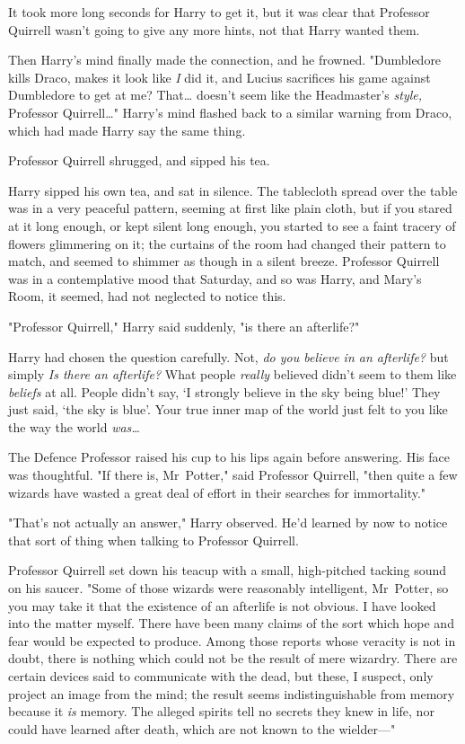 It took more long seconds for Harry to get it, but it was clear that Professor
Quirrell wasn't going to give any more hints, not that Harry wanted them.

Then Harry's mind finally made the connection, and he frowned. "Dumbledore
kills Draco, makes it look like \emph{I} did it, and Lucius sacrifices his game
against Dumbledore to get at me? That{\ldots} doesn't seem like the
Headmaster's \emph{style,} Professor Quirrell{\ldots}" Harry's mind flashed
back to a similar warning from Draco, which had made Harry say the same thing.

Professor Quirrell shrugged, and sipped his tea.

Harry sipped his own tea, and sat in silence. The tablecloth spread over the
table was in a very peaceful pattern, seeming at first like plain cloth, but if
you stared at it long enough, or kept silent long enough, you started to see a
faint tracery of flowers glimmering on it; the curtains of the room had changed
their pattern to match, and seemed to shimmer as though in a silent breeze.
Professor Quirrell was in a contemplative mood that Saturday, and so was Harry,
and Mary's Room, it seemed, had not neglected to notice this.

"Professor Quirrell," Harry said suddenly, "is there an afterlife?"

Harry had chosen the question carefully. Not, \emph{do you believe in an
afterlife?} but simply \emph{Is there an afterlife?} What people \emph{really}
believed didn't seem to them like \emph{beliefs} at all. People didn't say, `I
strongly believe in the sky being blue!' They just said, `the sky is blue'.
Your true inner map of the world just felt to you like the way the world
\emph{was{\ldots}}

The Defence Professor raised his cup to his lips again before answering. His
face was thoughtful. "If there is, Mr~Potter," said Professor Quirrell, "then
quite a few wizards have wasted a great deal of effort in their searches for
immortality."

"That's not actually an answer," Harry observed. He'd learned by now to notice
that sort of thing when talking to Professor Quirrell.

Professor Quirrell set down his teacup with a small, high-pitched tacking sound
on his saucer. "Some of those wizards were reasonably intelligent, Mr~Potter,
so you may take it that the existence of an afterlife is not obvious. I have
looked into the matter myself. There have been many claims of the sort which
hope and fear would be expected to produce. Among those reports whose veracity
is not in doubt, there is nothing which could not be the result of mere
wizardry. There are certain devices said to communicate with the dead, but
these, I suspect, only project an image from the mind; the result seems
indistinguishable from memory because it \emph{is} memory. The alleged spirits
tell no secrets they knew in life, nor could have learned after death, which
are not known to the wielder---"

